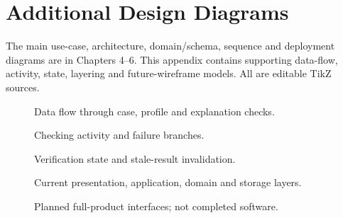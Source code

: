 \chapter{Additional Design Diagrams}
The main use-case, architecture, domain/schema, sequence and deployment diagrams are in Chapters 4--6. This appendix contains supporting data-flow, activity, state, layering and future-wireframe models. All are editable TikZ sources.
\begin{figure}[htbp]\centering\begin{minipage}{.82\linewidth}\end{minipage}\caption{Data flow through case, profile and explanation checks.}\label{fig:dataflow}\end{figure}
\begin{figure}[htbp]\centering\caption{Checking activity and failure branches.}\label{fig:activity}\end{figure}
\begin{figure}[htbp]\centering\caption{Verification state and stale-result invalidation.}\label{fig:state}\end{figure}
\begin{figure}[htbp]\centering\caption{Current presentation, application, domain and storage layers.}\label{fig:layers}\end{figure}
\begin{figure}[htbp]\centering\caption{Planned full-product interfaces; not completed software.}\label{fig:final-wireframes}\end{figure}
